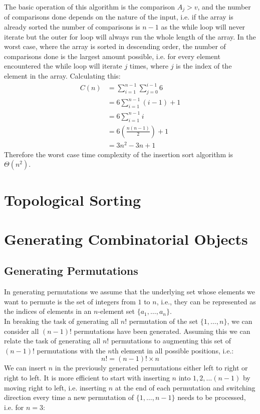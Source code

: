 \documentclass[12pt letter]{report}
\begin{document}
The basic operation of this algorithm is the comparison $A_j > v$, and the number of comparisons done depends on the
nature of the input, i.e. if the array is already sorted the number of comparisons is $n-1$ as the while loop will never
iterate but the outer for loop will always run the whole length of the array. In the worst case, where the array is
sorted in descending order, the number of comparisons done is the largest amount possible, i.e. for every element
encountered the while loop will iterate $j$ times, where $j$ is the index of the element in the array. Calculating this:
\begin{align*}
  C \left( n \right) & = \displaystyle\sum_{i=1}^{n-1} \displaystyle\sum_{j=0}^{i-1} 6 \\
                     & = 6\displaystyle\sum_{i=1}^{n-1} \left( i - 1 \right) + 1       \\
                     & = 6 \displaystyle\sum_{i=1}^{n-1} i                             \\
                     & =  6 \left( \frac{n \left( n - 1 \right)}{2} \right) + 1        \\
                     & =  3n^{2} - 3n + 1
\end{align*}
Therefore the worst case time complexity of the insertion sort algorithm is $\Theta \left( n^{2} \right) $.

\chapter{Topological Sorting}

\chapter{Generating Combinatorial Objects}

\section{Generating Permutations}
In generating permutations we assume that the underlying set whose elements we want to permute is the set of integers
from $1$ to $n$, i.e., they can be represented as the indices of elements in an $n$-element set $\{a_1,\ldots,a_n\} $.\\
In breaking the task of generating all $n!$ permutation of the set $\{1, \ldots, n\} $, we can consider all $ \left( n -
  1\right)! $ permutations have been generated. Assuming this we can relate the task of generating all $n!$ permutations
to augmenting this set of $ \left( n - 1 \right)! $ permutations with the $n$th element in all possible positions, i.e.:
\[
  n! = \left( n - 1 \right)! \times n
\]
We can insert $n$ in the previously generated permutations either left to right or right to left. It is more efficient
to start with inserting $n$ into $1,2,\ldots \left( n-1 \right) $ by moving right to left, i.e. inserting $n$ at the end of
each permutation and switching direction every time a new permutation of $\{1, \ldots, n - 1\} $ needs to be
processed, i.e. for $n = 3$:
\end{document}
